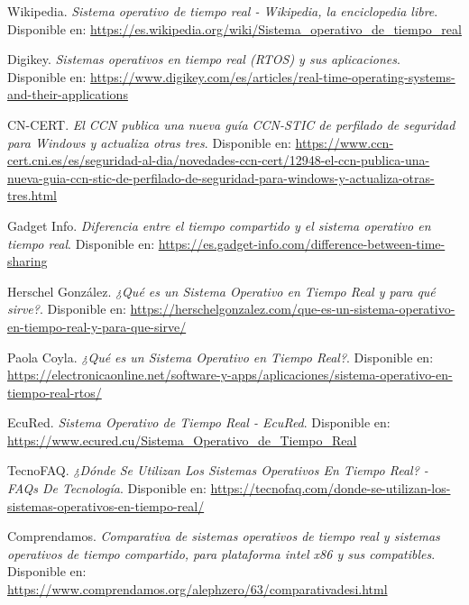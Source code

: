\documentclass{article}
\begin{document}
\newpage


\begin{thebibliography}{99} %
    
     Wikipedia. \textit{Sistema operativo de tiempo real - Wikipedia, la enciclopedia libre}. Disponible en: \url{https://es.wikipedia.org/wiki/Sistema_operativo_de_tiempo_real}

     Digikey. \textit{Sistemas operativos en tiempo real (RTOS) y sus aplicaciones}. Disponible en: \url{https://www.digikey.com/es/articles/real-time-operating-systems-and-their-applications}
    
     CN-CERT. \textit{El CCN publica una nueva guía CCN-STIC de perfilado de seguridad para Windows y actualiza otras tres}. Disponible en: \url{https://www.ccn-cert.cni.es/es/seguridad-al-dia/novedades-ccn-cert/12948-el-ccn-publica-una-nueva-guia-ccn-stic-de-perfilado-de-seguridad-para-windows-y-actualiza-otras-tres.html}
    
     Gadget Info. \textit{Diferencia entre el tiempo compartido y el sistema operativo en tiempo real}. Disponible en: \url{https://es.gadget-info.com/difference-between-time-sharing}
    
     Herschel González. \textit{¿Qué es un Sistema Operativo en Tiempo Real y para qué sirve?}. Disponible en: \url{https://herschelgonzalez.com/que-es-un-sistema-operativo-en-tiempo-real-y-para-que-sirve/}
    
     Paola Coyla. \textit{¿Qué es un Sistema Operativo en Tiempo Real?}. Disponible en: \url{https://electronicaonline.net/software-y-apps/aplicaciones/sistema-operativo-en-tiempo-real-rtos/}
    
     EcuRed. \textit{Sistema Operativo de Tiempo Real - EcuRed}. Disponible en: \url{https://www.ecured.cu/Sistema_Operativo_de_Tiempo_Real}
    
     TecnoFAQ. \textit{¿Dónde Se Utilizan Los Sistemas Operativos En Tiempo Real? - FAQs De Tecnología}. Disponible en: \url{https://tecnofaq.com/donde-se-utilizan-los-sistemas-operativos-en-tiempo-real/}
    
     Comprendamos. \textit{Comparativa de sistemas operativos de tiempo real y sistemas operativos de tiempo compartido, para plataforma intel x86 y sus compatibles}. Disponible en: \url{https://www.comprendamos.org/alephzero/63/comparativadesi.html}
    

\end{thebibliography}
\end{document}

